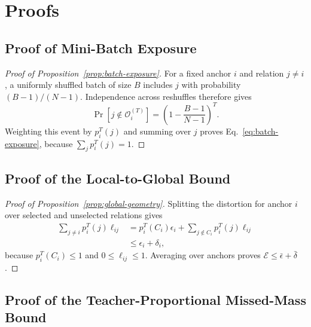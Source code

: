 \section{Proofs}
\label{app:theory}

\subsection{Proof of Mini-Batch Exposure}
\label{app:batch-proof}

\begin{proof}[Proof of Proposition~\ref{prop:batch-exposure}]
For a fixed anchor $i$ and relation $j\neq i$, a uniformly shuffled batch of size $B$ includes $j$ with probability $(B-1)/(N-1)$. Independence across reshuffles therefore gives
\begin{equation}
\Pr[j\notin\mathcal O_i^{(T)}]
=\left(1-\frac{B-1}{N-1}\right)^T.
\end{equation}
Weighting this event by $p_i^T(j)$ and summing over $j$ proves Eq.~\eqref{eq:batch-exposure}, because $\sum_jp_i^T(j)=1$.
\end{proof}

\subsection{Proof of the Local-to-Global Bound}
\label{app:local-global-proof}

\begin{proof}[Proof of Proposition~\ref{prop:global-geometry}]
Splitting the distortion for anchor $i$ over selected and unselected relations gives
\begin{align}
\sum_{j\neq i}p_i^T(j)\ell_{ij}
&=p_i^T(C_i)\epsilon_i
+\sum_{j\notin C_i}p_i^T(j)\ell_{ij}\\
&\leq \epsilon_i+\delta_i,
\end{align}
because $p_i^T(C_i)\leq1$ and $0\leq\ell_{ij}\leq1$. Averaging over anchors proves $\mathcal E\leq\bar\epsilon+\bar\delta$.
\end{proof}

\subsection{Proof of the Teacher-Proportional Missed-Mass Bound}
\label{app:proportional-bound}

